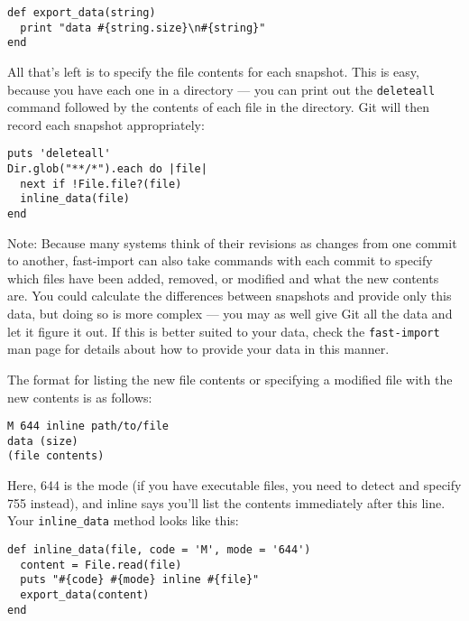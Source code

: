 \documentclass[a4paper]{book}
\newcounter{tab}[chapter]
\begin{document}
\begin{shaded}\begin{verbatim}
def export_data(string)
  print "data #{string.size}\n#{string}"
end
\end{verbatim}\end{shaded}

All that's left is to specify the file contents for each snapshot. This is easy, because you have each one in a directory --- you can print out the \texttt{deleteall} command followed by the contents of each file in the directory. Git will then record each snapshot appropriately:

\begin{shaded}\begin{verbatim}
puts 'deleteall'
Dir.glob("**/*").each do |file|
  next if !File.file?(file)
  inline_data(file)
end
\end{verbatim}\end{shaded}

Note: Because many systems think of their revisions as changes from one commit to another, fast-import can also take commands with each commit to specify which files have been added, removed, or modified and what the new contents are. You could calculate the differences between snapshots and provide only this data, but doing so is more complex --- you may as well give Git all the data and let it figure it out. If this is better suited to your data, check the \texttt{fast-import} man page for details about how to provide your data in this manner.

The format for listing the new file contents or specifying a modified file with the new contents is as follows:

\begin{shaded}\begin{verbatim}
M 644 inline path/to/file
data (size)
(file contents)
\end{verbatim}\end{shaded}

Here, 644 is the mode (if you have executable files, you need to detect and specify 755 instead), and inline says you'll list the contents immediately after this line. Your \texttt{inline\_data} method looks like this:

\begin{shaded}\begin{verbatim}
def inline_data(file, code = 'M', mode = '644')
  content = File.read(file)
  puts "#{code} #{mode} inline #{file}"
  export_data(content)
end
\end{verbatim}\end{shaded}
\end{document}
